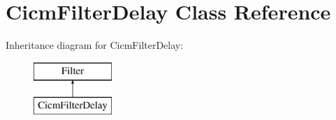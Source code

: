 \hypertarget{class_cicm_filter_delay}{\section{Cicm\-Filter\-Delay Class Reference}
\label{class_cicm_filter_delay}
}
Inheritance diagram for Cicm\-Filter\-Delay\-:\begin{figure}[H]
\begin{center}
\leavevmode
\includegraphics[height=2.000000cm]{class_cicm_filter_delay}
\end{center}
\end{figure}
